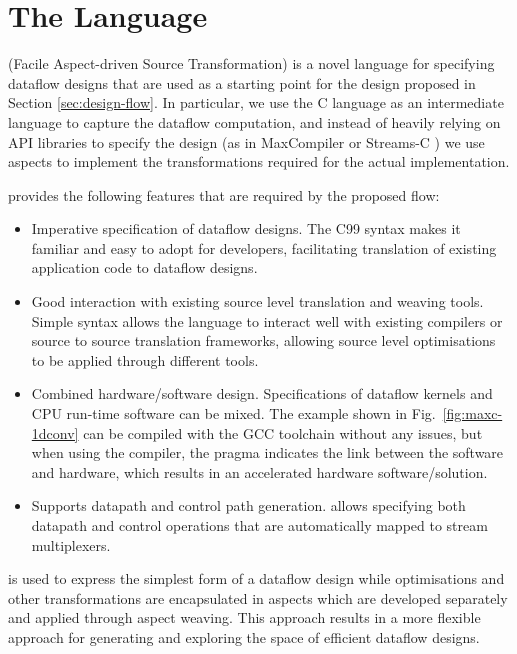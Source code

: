 \section{The \MAXC{} Language}
\label{sec:maxc}

\MAXC{} (Facile Aspect-driven Source Transformation) is a novel
language for specifying dataflow designs that are used as a starting
point for the design proposed in Section \ref{sec:design-flow}. In
particular, we use the C language as an intermediate language to
capture the dataflow computation, and instead of heavily relying on
API libraries to specify the design (as in MaxCompiler
\cite{MaxelerTechnologies:2012} or Streams-C
\cite{Gokhale:Stone:Arnold:Kalinowski:2000}) we use aspects to
implement the transformations required for the actual implementation.

\MAXC{} provides the following features that are
required by the proposed flow:

\begin{itemize}
\item Imperative specification of dataflow designs. The C99 syntax
  makes it familiar and easy to adopt for developers, facilitating
  translation of existing application code to dataflow designs.
\item Good interaction with existing source level translation and
  weaving tools. Simple syntax allows the language to interact well
  with existing compilers or source to source translation frameworks,
  allowing source level optimisations to be applied through different
  tools.
\item Combined hardware/software design. Specifications of dataflow
  kernels and CPU run-time software can be mixed. The example shown in
  Fig.~\ref{fig:maxc-1dconv} can be compiled with the GCC toolchain
  without any issues, but when using the \MAXC{} compiler, the pragma
  indicates the link between the software and hardware, which results
  in an accelerated hardware software/solution.
\item Supports datapath and control path generation. \MAXC{} allows
  specifying both datapath and control operations that are
  automatically mapped to stream multiplexers.
\end{itemize}

\MAXC{} is used to express the simplest form of a dataflow design
while optimisations and other transformations are encapsulated in
aspects which are developed separately and applied through aspect
weaving. This approach results in a more flexible approach for
generating and exploring the space of efficient dataflow designs.


